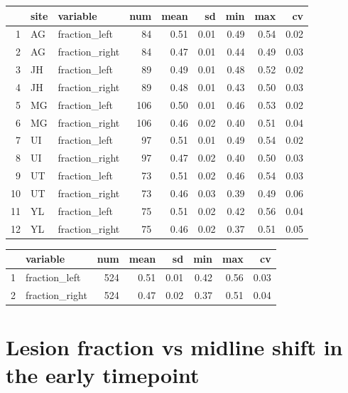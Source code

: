 \documentclass[
]{article}
\begin{document}
\begin{table}[ht]
\centering
\begin{tabular}{rllrrrrrr}
  \hline
 & site & variable & num & mean & sd & min & max & cv \\ 
  \hline
1 & AG & fraction\_left &  84 & 0.51 & 0.01 & 0.49 & 0.54 & 0.02 \\ 
  2 & AG & fraction\_right &  84 & 0.47 & 0.01 & 0.44 & 0.49 & 0.03 \\ 
  3 & JH & fraction\_left &  89 & 0.49 & 0.01 & 0.48 & 0.52 & 0.02 \\ 
  4 & JH & fraction\_right &  89 & 0.48 & 0.01 & 0.43 & 0.50 & 0.03 \\ 
  5 & MG & fraction\_left & 106 & 0.50 & 0.01 & 0.46 & 0.53 & 0.02 \\ 
  6 & MG & fraction\_right & 106 & 0.46 & 0.02 & 0.40 & 0.51 & 0.04 \\ 
  7 & UI & fraction\_left &  97 & 0.51 & 0.01 & 0.49 & 0.54 & 0.02 \\ 
  8 & UI & fraction\_right &  97 & 0.47 & 0.02 & 0.40 & 0.50 & 0.03 \\ 
  9 & UT & fraction\_left &  73 & 0.51 & 0.02 & 0.46 & 0.54 & 0.03 \\ 
  10 & UT & fraction\_right &  73 & 0.46 & 0.03 & 0.39 & 0.49 & 0.06 \\ 
  11 & YL & fraction\_left &  75 & 0.51 & 0.02 & 0.42 & 0.56 & 0.04 \\ 
  12 & YL & fraction\_right &  75 & 0.46 & 0.02 & 0.37 & 0.51 & 0.05 \\ 
   \hline
\end{tabular}
\end{table}
\begin{table}[ht]
\centering
\begin{tabular}{rlrrrrrr}
  \hline
 & variable & num & mean & sd & min & max & cv \\ 
  \hline
1 & fraction\_left & 524 & 0.51 & 0.01 & 0.42 & 0.56 & 0.03 \\ 
  2 & fraction\_right & 524 & 0.47 & 0.02 & 0.37 & 0.51 & 0.04 \\ 
   \hline
\end{tabular}
\end{table}

\hypertarget{lesion-fraction-vs-midline-shift-in-the-early-timepoint}{%
\section{Lesion fraction vs midline shift in the early
timepoint}\label{lesion-fraction-vs-midline-shift-in-the-early-timepoint}}
\end{document}
